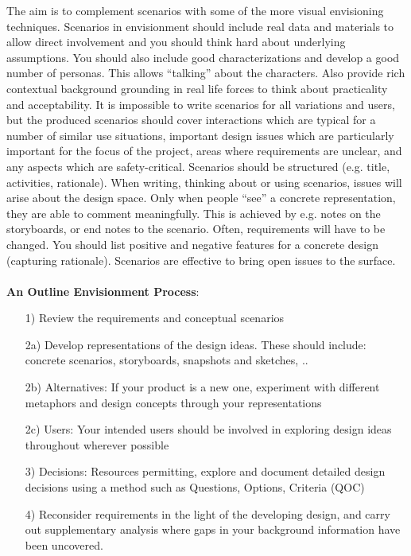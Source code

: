 The aim is to complement scenarios with some of the more visual envisioning techniques. Scenarios in envisionment should include real data and materials to allow direct involvement and you should think hard about underlying assumptions. You should also include good characterizations and develop a good number of personas. This allows ``talking'' about the characters. Also provide rich contextual background grounding in real life forces to think about practicality and acceptability. It is impossible to write scenarios for all variations and users, but the produced scenarios should cover interactions which are typical for a number of similar use situations, important design issues which are particularly important for the focus of the project, areas where requirements are unclear, and any aspects which are safety-critical. Scenarios should be structured (e.g. title, activities, rationale). When writing, thinking about or using scenarios, issues will arise about the design space. Only when people ``see'' a concrete representation, they are able to comment meaningfully. This is achieved by e.g. notes on the storyboards, or end notes to the scenario. Often, requirements will have to be changed. You should list positive and negative features for a concrete design (capturing rationale). Scenarios are effective to bring open issues to the surface.\\\\
\textbf{An Outline Envisionment Process}:
\begin{itemize}
\item[1)] Review the requirements and conceptual scenarios
\item[2a)] Develop representations of the design ideas. These should include: concrete scenarios, storyboards, snapshots and sketches, ..
\item[2b)] Alternatives: If your product is a new one, experiment with different metaphors and design concepts through your representations
\item[2c)] Users: Your intended users should be involved in exploring design ideas throughout wherever possible
\item[3)] Decisions: Resources permitting, explore and document detailed design decisions using a method such as Questions, Options, Criteria (QOC)
\item[4)] Reconsider requirements in the light of the developing design, and carry out supplementary analysis where gaps in your background information have been uncovered.
\end{itemize}
